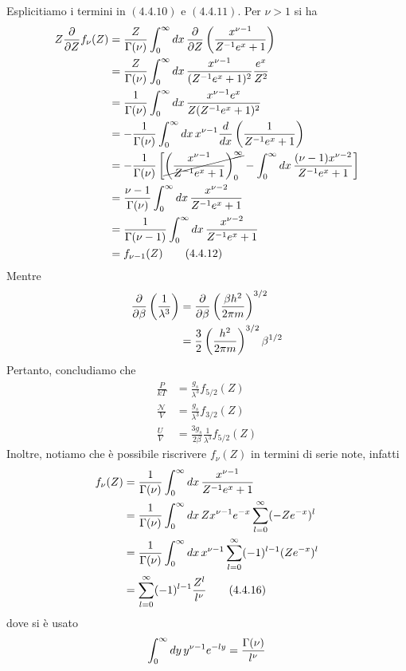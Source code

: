 \documentclass{article}
\begin{document}
Esplicitiamo i termini in $(4.4.10)$ e $(4.4.11)$. Per $\nu > 1$ si ha
\begin{align}
    Z\frac{\partial}{\partial Z}f_\nu(Z) &= \frac{Z}{\Gamma(\nu)}\int_0^\infty dx \, \frac{\partial}{\partial Z}\left(\frac{x^{\nu - 1}}{Z^{-1}e^x + 1}\right) \notag \\
    &= \frac{Z}{\Gamma(\nu)}\int_0^\infty dx \, \frac{x^{\nu - 1}}{(Z^{-1}e^x + 1)^2}\frac{e^x}{Z^2} \notag \\
    &= \frac{1}{\Gamma(\nu)}\int_0^\infty dx \, \frac{x^{\nu - 1}e^x}{Z(Z^{-1}e^x + 1)^2} \notag \\
    &= -\frac{1}{\Gamma(\nu)}\int_0^\infty dx \, x^{\nu - 1}\frac{d}{dx}\left(\frac{1}{Z^{-1}e^x + 1}\right) \notag \\
    &= -\frac{1}{\Gamma(\nu)}\left[\cancel{\left(\frac{x^{\nu - 1}}{Z^{-1}e^x + 1}\right)_0^\infty} - \int_0^\infty dx \, \frac{(\nu - 1)x^{\nu - 2}}{Z^{-1}e^x + 1}\right] \notag \\
    &= \frac{\nu - 1}{\Gamma(\nu)}\int_0^\infty dx \, \frac{x^{\nu - 2}}{Z^{-1}e^x + 1} \notag \\
    &= \frac{1}{\Gamma(\nu - 1)}\int_0^\infty dx \, \frac{x^{\nu - 2}}{Z^{-1}e^x + 1} \notag \\
    &= f_{\nu - 1}(Z) \tag{4.4.12}
\end{align}
Mentre
\begin{align}
    \frac{\partial}{\partial \beta}\left(\frac{1}{\lambda^3}\right) &= \frac{\partial}{\partial \beta}\left(\frac{\beta h^2}{2\pi m}\right)^{3/2} \notag \\
    &= \frac{3}{2}\left(\frac{h^2}{2\pi m}\right)^{3/2}\beta^{1/2} \notag
\end{align}
Pertanto, concludiamo che 
\begin{align}
    \frac{P}{kT} &= \frac{g_s}{\lambda^3}f_{5/2}(Z) \tag{4.4.13} \\
    \frac{\mathcal{N}}{V} &= \frac{g_s}{\lambda^3}f_{3/2}(Z) \tag{4.4.14} \\
    \frac{U}{V} &= \frac{3g_s}{2\beta}\frac{1}{\lambda^3}f_{5/2}(Z) \tag{4.4.15}
\end{align}
Inoltre, notiamo che è possibile riscrivere $f_\nu(Z)$ in termini di serie note, infatti
\begin{align}
    f_\nu(Z) &= \frac{1}{\Gamma(\nu)}\int_0^\infty dx \, \frac{x^{\nu - 1}}{Z^{-1}e^x + 1} \notag \\
    &= \frac{1}{\Gamma(\nu)}\int_0^\infty dx \, Zx^{\nu - 1}e^{-x}\sum_{l = 0}^\infty (-Ze^{-x})^l \notag \\
    &= \frac{1}{\Gamma(\nu)}\int_0^\infty dx \, x^{\nu - 1}\sum_{l = 0}^\infty (-1)^{l - 1}(Ze^{-x})^l \notag \\
    &= \sum_{l = 0}^\infty (-1)^{l - 1}\frac{Z^l}{l^\nu} \tag{4.4.16}
\end{align}
dove si è usato
\begin{align}
    \int_0^\infty dy \, y^{\nu - 1}e^{-ly} = \frac{\Gamma(\nu)}{l^\nu} \notag
\end{align}
\end{document}
